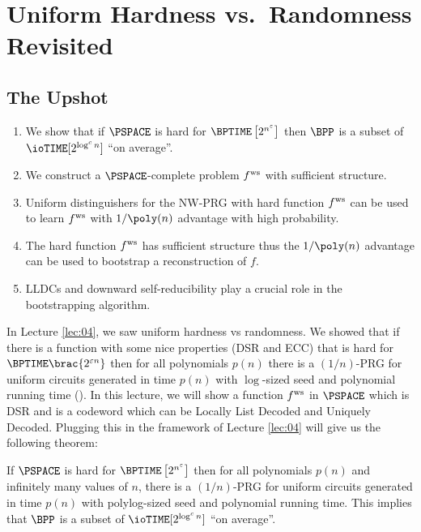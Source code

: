 \newcommand{\fn}{\mathbb{F}_n}
\newcommand\antipi{\rotatebox[origin=c]{180}{$\Pi$}}

\chapter{Uniform Hardness vs.\ Randomness Revisited}
\label{lec:08}

\section*{The Upshot}

\begin{enumerate}
	\item We show that if $\PSPACE$ is hard for $\BPTIME\left[2^{n^\eps}\right]$ then $\BPP$ is a subset of \\ $\ioTIME[2^{\log^c n}]$ ``on average''.
	\item We construct a $\PSPACE$-complete problem $ f^{\text{ws}} $ with sufficient structure.
	\item Uniform distinguishers for the NW-PRG with hard function $ f^{\text{ws}} $ can be
	used to learn $ f^{\text{ws}} $ with $1/\poly(n)$ advantage with high probability.
	\item The hard function $ f^{\text{ws}} $ has sufficient structure thus the $1/\poly(n)$
	advantage can be used to bootstrap a reconstruction of $f$.
	\item LLDCs and downward self-reducibility play a crucial role in the
	bootstrapping algorithm.
\end{enumerate}

In Lecture \ref{lec:04}, we saw uniform hardness vs randomness. We showed that if there is a function with some nice properties (DSR and ECC) that is hard for $\BPTIME\brac{2^{\eps n}}$ then for all polynomials $p(n)$ there is a $(1 / n)$-PRG for uniform circuits generated in time $p(n)$ with $\log$-sized seed and polynomial running time (). 
In this lecture, we will show a function $ f^{\text{ws}} $ in $\PSPACE$ which is DSR and  is a codeword which can be Locally List Decoded and Uniquely Decoded. Plugging this in the framework of Lecture \ref{lec:04} will give us the following theorem:
\begin{theorem}\label{thm:uniform-hard-random-PSPACE}
	If $\PSPACE$ is hard for $\BPTIME\left[2^{n^\eps}\right]$ then for all polynomials $p(n)$ and infinitely many values of $n$, there is a $(1/n)$-PRG for uniform circuits generated in time $p(n)$ with polylog-sized seed and polynomial running time. This implies that $\BPP$ is a subset of $\ioTIME[2^{\log^c n}]$ ``on average''.
\end{theorem}



